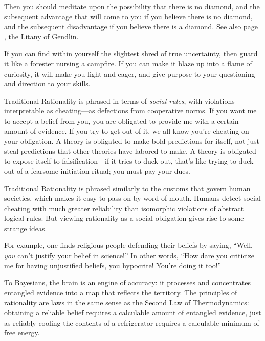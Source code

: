 {
 Then you should meditate upon the possibility that there is no
diamond, and the subsequent advantage that will come to you if you
believe there is no diamond, and the subsequent disadvantage if you
believe there is a diamond. See also page \pageref{litany_of_gendlin}, the Litany of Gendlin.}

{
 If you can find within yourself the slightest shred of true
uncertainty, then guard it like a forester nursing a campfire. If you
can make it blaze up into a flame of curiosity, it will make you light
and eager, and give purpose to your questioning and direction to your
skills.}

\myendsectiontext


\bigskip


{
 Traditional Rationality is phrased in terms of \textit{social
rules}, with violations interpretable as cheating---as defections from
cooperative norms. If you want me to accept a belief from you, you are
obligated to provide me with a certain amount of evidence. If you try
to get out of it, we all know you're cheating on your
obligation. A theory is obligated to make bold predictions for itself,
not just steal predictions that other theories have labored to make. A
theory is obligated to expose itself to falsification---if it tries to
duck out, that's like trying to duck out of a fearsome
initiation ritual; you must pay your dues. }

{
 Traditional Rationality is phrased similarly to the customs that
govern human societies, which makes it easy to pass on by word of
mouth. Humans detect social cheating with much greater reliability than
isomorphic violations of abstract logical rules. But viewing
rationality as a social obligation gives rise to some strange ideas.}

{
 For example, one finds religious people defending their beliefs by
saying, ``Well, \textit{you} can't
justify your belief in science!'' In other words,
``How dare you criticize me for having unjustified
beliefs, you hypocrite! You're doing it
too!''}

{
 To Bayesians, the brain is an engine of accuracy: it processes and
concentrates entangled evidence into a map that reflects the territory.
The principles of rationality are laws in the same sense as the Second
Law of Thermodynamics: obtaining a reliable belief requires a
calculable amount of entangled evidence, just as reliably cooling the
contents of a refrigerator requires a calculable minimum of free
energy.}

